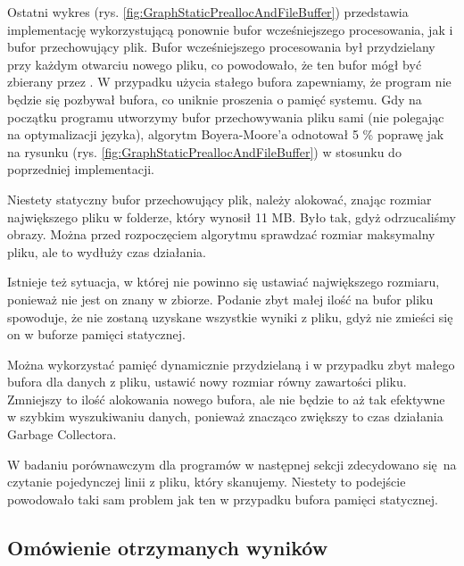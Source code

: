 Ostatni wykres (rys. \ref{fig:GraphStaticPreallocAndFileBuffer}) przedstawia implementację
wykorzystującą ponownie bufor wcześniejszego procesowania, jak i bufor przechowujący plik.
Bufor wcześniejszego procesowania był przydzielany przy każdym otwarciu nowego pliku,
co powodowało, że ten bufor mógł być zbierany przez .
W przypadku użycia stałego bufora zapewniamy, że program nie będzie się pozbywał
bufora, co uniknie proszenia o pamięć systemu. Gdy na początku programu utworzymy
bufor przechowywania pliku sami (nie polegając na optymalizacji języka), algorytm Boyera-Moore'a
odnotował 5 \% poprawę jak na rysunku (rys. \ref{fig:GraphStaticPreallocAndFileBuffer}) w stosunku do poprzedniej implementacji.

Niestety statyczny bufor przechowujący plik, należy alokować, znając rozmiar 
największego pliku w folderze, który wynosił 11 MB. Było tak, gdyż odrzucaliśmy
obrazy. Można przed rozpoczęciem algorytmu sprawdzać rozmiar maksymalny 
pliku, ale to wydłuży czas działania.

Istnieje też sytuacja, w której nie powinno się ustawiać największego rozmiaru, ponieważ nie
jest on znany w zbiorze. Podanie zbyt małej ilość na bufor pliku spowoduje,
że nie zostaną uzyskane wszystkie wyniki z pliku, gdyż nie zmieści się on w buforze pamięci statycznej.

Można wykorzystać pamięć dynamicznie przydzielaną i w przypadku zbyt małego 
bufora dla danych z pliku, ustawić nowy rozmiar równy zawartości pliku.
Zmniejszy to ilość alokowania nowego bufora, ale nie będzie to aż tak efektywne
w szybkim wyszukiwaniu danych, ponieważ znacząco zwiększy to czas działania
Garbage Collectora.

W badaniu porównawczym dla programów w następnej sekcji zdecydowano się na
czytanie pojedynczej linii z pliku, który skanujemy. Niestety to podejście
powodowało taki sam problem jak ten w przypadku bufora pamięci statycznej.

\subsection{Omówienie otrzymanych wyników}
\label{rozdzial:wynikiBenchmarkowAlgos}

